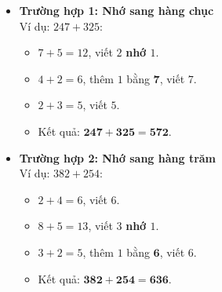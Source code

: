 \documentclass[10pt,a4paper]{article}
\begin{document}
\begin{minipage}[t]{0.49\textwidth}\vspace{0pt}
\begin{tcolorbox}[
  enhanced,
  colback=teal!4!white,
  colframe=teal!75!black,
  arc=2mm, boxrule=0.8pt,
  left=2mm, right=2mm, top=1.8mm, bottom=1.8mm,
  title={\footnotesize\bfseries\color{white}\faSliders\ 2. Hai trường hợp có nhớ điển hình}
]
{\footnotesize
\begin{itemize}\setlength{\itemsep}{1pt}\setlength{\leftskip}{-2.5mm}
  \item \textbf{Trường hợp 1: Nhớ sang hàng chục}\\
  Ví dụ: $247 + 325$:
  \begin{itemize}\setlength{\itemsep}{0.5pt}\setlength{\leftskip}{-2mm}
    \item $7 + 5 = 12$, viết $2$ \textbf{nhớ $1$}.
    \item $4 + 2 = 6$, thêm $1$ bằng $\mathbf{7}$, viết $7$.
    \item $2 + 3 = 5$, viết $5$.
    \item Kết quả: $\mathbf{247 + 325 = 572}$.
  \end{itemize}
  \item \textbf{Trường hợp 2: Nhớ sang hàng trăm}\\
  Ví dụ: $382 + 254$:
  \begin{itemize}\setlength{\itemsep}{0.5pt}\setlength{\leftskip}{-2mm}
    \item $2 + 4 = 6$, viết $6$.
    \item $8 + 5 = 13$, viết $3$ \textbf{nhớ $1$}.
    \item $3 + 2 = 5$, thêm $1$ bằng $\mathbf{6}$, viết $6$.
    \item Kết quả: $\mathbf{382 + 254 = 636}$.
  \end{itemize}
\end{itemize}
}
\end{tcolorbox}
\end{minipage}
\end{document}
